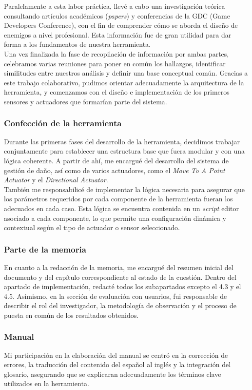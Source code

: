 Paralelamente a esta labor práctica, llevé a cabo una investigación teórica consultando artículos académicos (\textit{papers}) y conferencias de la GDC (Game Developers Conference), con el fin de comprender cómo se aborda el diseño de enemigos a nivel profesional. Esta información fue de gran utilidad para dar forma a los fundamentos de nuestra herramienta.\\

Una vez finalizada la fase de recopilación de información por ambas partes, celebramos varias reuniones para poner en común los hallazgos, identificar similitudes entre nuestros análisis y definir una base conceptual común. Gracias a este trabajo colaborativo, pudimos orientar adecuadamente la arquitectura de la herramienta, y comenzamos con el diseño e implementación de los primeros sensores y actuadores que formarían parte del sistema.\\

\subsubsection*{Confección de la herramienta}

Durante las primeras fases del desarrollo de la herramienta, decidimos trabajar conjuntamente para establecer una estructura base que fuera modular y con una lógica coherente. A partir de ahí, me encargué del desarrollo del sistema de gestión de daño, así como de varios actuadores, como el \textit{Move To A Point Actuator} y el \textit{Directional Actuator}. \\

También me responsabilicé de implementar la lógica necesaria para asegurar que los parámetros requeridos por cada componente de la herramienta fueran los adecuados en cada caso. Esta lógica se encuentra contenida en un \textit{script} editor asociado a cada componente, lo que permite una configuración dinámica y contextual según el tipo de actuador o sensor seleccionado.\\

\subsubsection*{Parte de la memoria}

En cuanto a la redacción de la memoria, me encargué del resumen inicial del documento y del capítulo correspondiente al estado de la cuestión. Dentro del apartado de implementación, redacté todos los subapartados excepto el 4.3 y el 4.5. Asimismo, en la sección de evaluación con usuarios, fui responsable de describir el rol del investigador, la metodología de observación y el proceso de puesta en común de los resultados obtenidos.\\

\subsubsection*{Manual}
Mi participación en la elaboración del manual se centró en la corrección de errores, la traducción del contenido del español al inglés y la integración del glosario, asegurando que se explicaran adecuadamente los términos clave utilizados en la herramienta.\\


